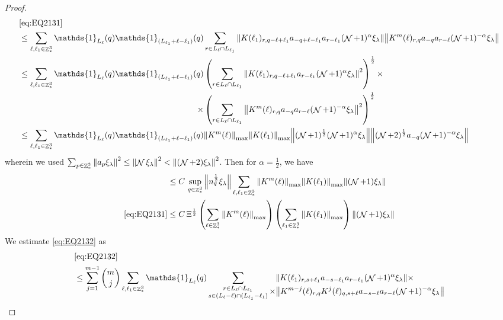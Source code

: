 \documentclass[12pt,a4paper]{article}
\numberwithin{equation}{section}
\newcommand{\1}{\mathbb{I}}
\DeclareMathOperator{\Z}{\mathbb{Z}}
\DeclareMathOperator{\NN}{\mathcal{N}}
\newcommand{\half}{\frac{1}{2}}
\theoremstyle{plain}
\theoremstyle{definition}
\theoremstyle{remark}
\theoremstyle{plain}
\theoremstyle{definition}
\theoremstyle{remark}
\begin{document}
\begin{proof}
\begin{alignat}{2}
    &\eqref{eq:EQ2131}\nonumber\\
    &\leq \sum\limits_{\ell, \ell_1\in \Z^3_*} \mathds{1}_{L_{\ell}}(q) \mathds{1}_{(L_{\ell_1}+\ell-\ell_1)}(q) \sum\limits_{r\in L_{\ell} \cap L_{\ell_1}} \norm{ K(\ell_1)_{r,q-\ell+\ell_1} a_{-q+\ell-\ell_1} a_{r-\ell_1}(\NN+1)^{\alpha}\xi_\lambda}\norm{ K^m(\ell)_{r,q} a_{-q}a_{r-\ell} (\NN+1)^{-\alpha} \xi_\lambda }\nonumber\\
    &\leq \sum\limits_{\ell, \ell_1\in \Z^3_*} \mathds{1}_{L_{\ell}}(q) \begin{aligned}[t]
     \mathds{1}_{(L_{\ell_1}+\ell-\ell_1)}(q) &\left(\sum\limits_{r\in L_{\ell} \cap L_{\ell_1}} \norm{ K(\ell_1)_{r,q-\ell+\ell_1} a_{r-\ell_1}(\NN+1)^{\alpha} \xi_\lambda}^2\right)^\half \times\nonumber\\ \times &\left(\sum\limits_{r\in L_{\ell} \cap L_{\ell_1}} \norm{ K^m(\ell)_{r,q} a_{-q}a_{r-\ell} (\NN+1)^{-\alpha} \xi_\lambda }^2 \right)^\half \end{aligned}\nonumber\\
    &\leq \sum\limits_{\ell, \ell_1\in \Z^3_*} \mathds{1}_{L_{\ell}}(q) \mathds{1}_{(L_{\ell_1}+\ell-\ell_1)}(q)  \norm{K^m(\ell)}_{\max} \norm{ K(\ell_1)}_{\max} \norm{ (\NN+1)^\half(\NN+1)^{\alpha} \xi_\lambda} \norm{ (\NN+2)^\half a_{-q} (\NN+1)^{-\alpha} \xi_\lambda }\nonumber
\end{alignat} 
wherein we used $\sum_{p\in \Z^3_*}\norm{a_p \xi_\lambda}^2\leq\norm{\NN\xi_\lambda}^2<\norm{(\NN+2)\xi_\lambda}^2$. Then for $\alpha =  \half $, we have 
\begin{align}
	&\leq C\, \sup\limits_{q\in \Z^3_*}\norm{n_q^\half \xi_\lambda } \sum\limits_{\ell, \ell_1\in \Z^3_*}   \norm{K^m(\ell)}_{\max} \norm{ K(\ell_1)}_{\max}   \norm{ (\NN+1) \xi_\lambda} \nonumber\\
	\eqref{eq:EQ2131}&\leq C\, \Xi^\half \left(\sum\limits_{\ell\in \Z^3_*} \norm{K^m(\ell)}_{\max}\right)\left(  \sum\limits_{ \ell_1\in \Z^3_*}  \norm{ K(\ell_1)}_{\max} \right) \norm{ (\NN+1) \xi_\lambda}\label{eq:estEQ2131} 
\end{align}  
We estimate \eqref{eq:EQ2132} as
\begin{align}
	&\eqref{eq:EQ2132}\nonumber\\
    &\leq \sum\limits_{j=1}^{m-1} {{m}\choose j} \sum\limits_{\ell, \ell_1\in \Z^3_*}\mathds{1}_{L_{\ell}}(q) \sum\limits_{\substack{r\in L_{\ell} \cap L_{\ell_1}\\ s \in (L_{\ell}-\ell) \cap (L_{\ell_1}-\ell_1)}} \begin{aligned}[t] &\norm{ K(\ell_1)_{r,s+\ell_1}a_{-s-\ell_1} a_{r-\ell_1} (\NN+1)^{\alpha}\xi_\lambda}\nonumber \times \\ \times&\norm{ K^{m-j}(\ell)_{r,q} K^{j}(\ell)_{q,s+\ell} a_{-s-\ell}a_{r-\ell} (\NN+1)^{-\alpha} \xi_\lambda }\end{aligned} \nonumber\\

\end{align}
\end{proof}
\end{document}

